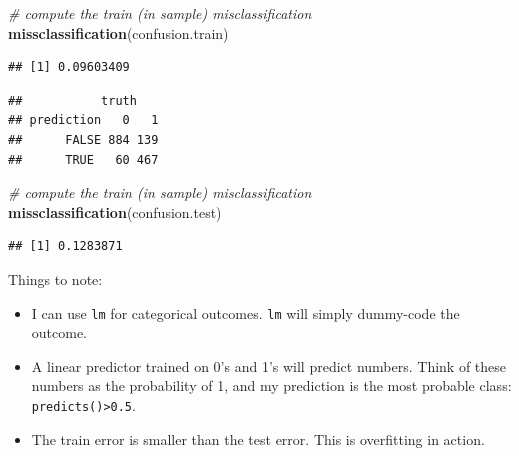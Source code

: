 \documentclass[]{book}
\newenvironment{Shaded}{\begin{snugshade}}{\end{snugshade}}
\newcommand{\KeywordTok}[1]{\textcolor[rgb]{0.13,0.29,0.53}{\textbf{#1}}}
\newcommand{\DataTypeTok}[1]{\textcolor[rgb]{0.13,0.29,0.53}{#1}}
\newcommand{\DecValTok}[1]{\textcolor[rgb]{0.00,0.00,0.81}{#1}}
\newcommand{\FloatTok}[1]{\textcolor[rgb]{0.00,0.00,0.81}{#1}}
\newcommand{\StringTok}[1]{\textcolor[rgb]{0.31,0.60,0.02}{#1}}
\newcommand{\CommentTok}[1]{\textcolor[rgb]{0.56,0.35,0.01}{\textit{#1}}}
\newcommand{\OperatorTok}[1]{\textcolor[rgb]{0.81,0.36,0.00}{\textbf{#1}}}
\newcommand{\NormalTok}[1]{#1}
\providecommand{\tightlist}{%
  \setlength{\itemsep}{0pt}\setlength{\parskip}{0pt}}
\theoremstyle{definition}
\theoremstyle{definition}
\theoremstyle{definition}
\theoremstyle{remark}
\begin{document}
\begin{Shaded}
\begin{Highlighting}[]
\CommentTok{# compute the train (in sample) misclassification}
\KeywordTok{missclassification}\NormalTok{(confusion.train) }
\end{Highlighting}
\end{Shaded}

\begin{verbatim}
## [1] 0.09603409
\end{verbatim}

\begin{Shaded}
\end{Shaded}

\begin{verbatim}
##           truth
## prediction   0   1
##      FALSE 884 139
##      TRUE   60 467
\end{verbatim}

\begin{Shaded}
\begin{Highlighting}[]
\CommentTok{# compute the train (in sample) misclassification}
\KeywordTok{missclassification}\NormalTok{(confusion.test)}
\end{Highlighting}
\end{Shaded}

\begin{verbatim}
## [1] 0.1283871
\end{verbatim}

Things to note:

\begin{itemize}
\tightlist
\item
  I can use \texttt{lm} for categorical outcomes. \texttt{lm} will
  simply dummy-code the outcome.
\item
  A linear predictor trained on 0's and 1's will predict numbers. Think
  of these numbers as the probability of 1, and my prediction is the
  most probable class: \texttt{predicts()\textgreater{}0.5}.
\item
  The train error is smaller than the test error. This is overfitting in
  action.
\end{itemize}
\end{document}
